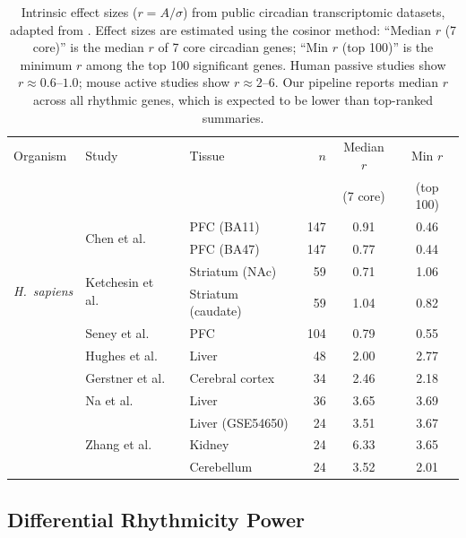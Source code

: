 \documentclass{article}
\begin{document}
\begin{table}[H]
\centering
\small
\begin{tabular}{ll|lrcc}
\toprule
Organism & Study & Tissue & $n$ & \multicolumn{1}{c}{Median $r$} & \multicolumn{1}{c}{Min $r$} \\
 & & & & \multicolumn{1}{c}{(7 core)} & \multicolumn{1}{c}{(top 100)} \\
\midrule
\multirow{6}{*}{\textit{H.\ sapiens}} & \multirow{2}{*}{Chen et al.\ \cite{chen2016aging}} & PFC (BA11) & 147 & 0.91 & 0.46 \\
 & & PFC (BA47) & 147 & 0.77 & 0.44 \\
 & \multirow{2}{*}{Ketchesin et al.\ \cite{ketchesin2021diurnal}} & Striatum (NAc) & 59 & 0.71 & 1.06 \\
 & & Striatum (caudate) & 59 & 1.04 & 0.82 \\
 & Seney et al.\ \cite{seney2019diurnal} & PFC & 104 & 0.79 & 0.55 \\

\midrule
\multirow{6}{*}{\textit{M.\ musculus}} & Hughes et al.\ \cite{hughes2009harmonics} & Liver & 48 & 2.00 & 2.77 \\
 & Gerstner et al.\ \cite{gerstner2016removal} & Cerebral cortex & 34 & 2.46 & 2.18 \\
 & Na et al.\ \cite{na2009comprehensive} & Liver & 36 & 3.65 & 3.69 \\
 & \multirow{3}{*}{Zhang et al.\ \cite{zhang2014comprehensive}} & Liver (GSE54650) & 24 & 3.51 & 3.67 \\
 & & Kidney & 24 & 6.33 & 3.65 \\
 & & Cerebellum & 24 & 3.52 & 2.01 \\
\bottomrule
\end{tabular}
\caption{Intrinsic effect sizes ($r = A/\sigma$) from public circadian transcriptomic datasets, adapted from \cite{zong2023circapower}. Effect sizes are estimated using the cosinor method: ``Median $r$ (7 core)'' is the median $r$ of 7 core circadian genes; ``Min $r$ (top 100)'' is the minimum $r$ among the top 100 significant genes. Human passive studies show $r \approx 0.6$--$1.0$; mouse active studies show $r \approx 2$--$6$. Our pipeline reports median $r$ across all rhythmic genes, which is expected to be lower than top-ranked summaries.}
\label{tab:effect_sizes}
\end{table}

\subsection{Differential Rhythmicity Power}
\end{document}
